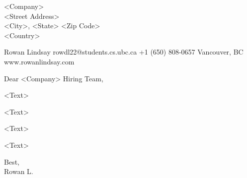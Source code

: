 \documentclass{letter}
\begin{document}
{
    \address{<Address> \\ Vancouver, BC V6T 1K5\\ Canada}
    \begin{letter}{
        <Company> \\ 
        <Street Address> \\ 
        <City>, <State> <Zip Code> \\ 
        <Country>
    }
    
    \header
        {Rowan Lindsay}
        {rowdl22@students.cs.ubc.ca} 
			{+1 (650) 808-0657} 
        {Vancouver, BC}
        {www.rowanlindsay.com}
        
    \opening{Dear <Company> Hiring Team,}
        \quad \quad <Text>         
            
        \quad \quad <Text>
        
	    \quad \quad <Text>
	    
	    \quad \quad <Text>
    
    \closing{Best, \\ Rowan L.}
    \end{letter}
}
\end{document}
